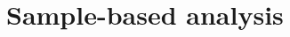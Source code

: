 \documentclass{article}
\newtheorem{lem}[thm]{Lemma}
\theoremstyle{definition}
\theoremstyle{remark}
\theoremstyle{mystyle}
\newcommand{\E}{\mathbb{E}}
\newcommand{\1}{\mathbbm{1}}
\begin{document}
\section{Sample-based analysis}

        
\end{document}
